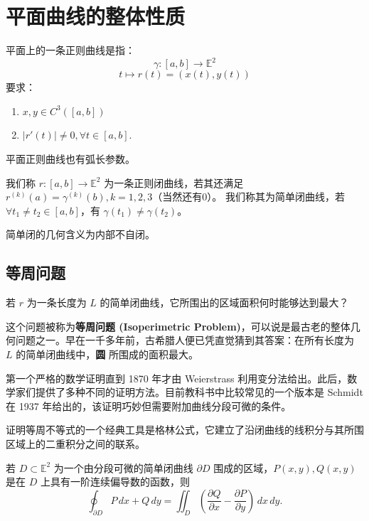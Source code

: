 \documentclass[lang=cn,10pt,thmcnt=section]{elegantbook}
\begin{document}
\section{平面曲线的整体性质}

\begin{definition}\label{def:curve}
    平面上的一条正则曲线是指：
    \[
    \gamma : [a, b] \rightarrow \mathbb{E}^2
    \]
    \[
    t \mapsto r(t) = (x(t), y(t))
    \]
    要求：
    \begin{enumerate}
        \item $x, y \in C^3([a, b])$
        \item $|r'(t)| \neq 0, \forall t \in [a, b]$.
    \end{enumerate}
    \begin{remark}
        平面正则曲线也有弧长参数。
    \end{remark}
    \end{definition}
    
    \begin{definition}\label{def:closed_curve}
    我们称 $r : [a, b] \rightarrow \mathbb{E}^2$ 为一条正则闭曲线，若其还满足 $r^{(k)}(a) = \gamma^{(k)}(b), k = 1, 2, 3$（当然还有0）。
    我们称其为简单闭曲线，若 $\forall t_1 \neq t_2 \in [a, b]$，有 $\gamma(t_1) \neq \gamma(t_2)$。
    
    
    \begin{remark}
        简单闭的几何含义为内部不自闭。
    \end{remark}
   
\end{definition}
\subsection{等周问题}
若 $r$ 为一条长度为 $L$ 的简单闭曲线，它所围出的区域面积何时能够达到最大？

这个问题被称为\textbf{等周问题 (Isoperimetric Problem)}，可以说是最古老的整体几何问题之一。早在一千多年前，古希腊人便已凭直觉猜到其答案：在所有长度为 $L$ 的简单闭曲线中，\textbf{圆} 所围成的面积最大。

第一个严格的数学证明直到 1870 年才由 Weierstrass 利用变分法给出。此后，数学家们提供了多种不同的证明方法。目前教科书中比较常见的一个版本是 Schmidt 在 1937 年给出的，该证明巧妙但需要附加曲线分段可微的条件。

证明等周不等式的一个经典工具是格林公式，它建立了沿闭曲线的线积分与其所围区域上的二重积分之间的联系。
\begin{theorem}[格林 (Green) 定理]\label{thm:green}
    若 $D \subset \mathbb{E}^2$ 为一个由分段可微的简单闭曲线 $\partial D$ 围成的区域，$P(x,y), Q(x,y)$ 是在 $D$ 上具有一阶连续偏导数的函数，则
    \[
    \oint_{\partial D} P \, dx + Q \, dy = \iint_D \left( \frac{\partial Q}{\partial x} - \frac{\partial P}{\partial y} \right) \, dx \, dy.
    \]
\end{theorem}
\end{document}
